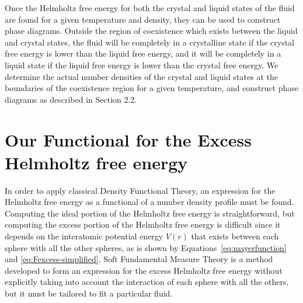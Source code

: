 \documentclass[double,12pt]{beavtex}
\begin{document}
Once the Helmholtz free energy for both the crystal and liquid states of 
the fluid are found for a given temperature and density, they can be 
used to construct phase diagrams.
Outside the region of coexistence which exists between the liquid and 
crystal states, the fluid will be completely in a crystalline state if the 
crystal free energy is lower than the liquid free energy, and it will be 
completely in a liquid state if the liquid free energy is lower than 
the crystal free energy. 
We determine the actual number densities of the crystal and liquid states
at the boundaries of the coexistence region for a given temperature, 
and construct phase diagrams as described in Section 2.2.

\section{Our Functional for the Excess Helmholtz free energy}
In order to apply classical Density Functional Theory, an expression 
for the Helmholtz free energy as a functional of a number density profile 
must be found. Computing the ideal portion of the 
Helmholtz free energy is straightforward, but computing the excess portion 
of the Helmholtz free energy is difficult since it depends on the interatomic 
potential energy $V(r)$ that exists between each sphere with all the other spheres, 
as is shown by Equations~\ref{eq:mayerfunction} and \ref{eq:Fexcess-simplified}.
Soft Fundamental Measure Theory is a method
developed to form an expression for the excess Helmholtz free energy without
explicitly taking into account the interaction of each sphere with all the others, 
but it must be tailored to fit a particular fluid\cite{schmidt1999density}.  
\end{document}
